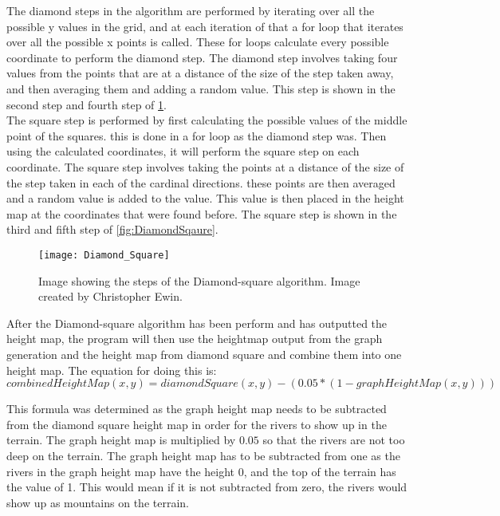 	The diamond steps in the algorithm are performed by iterating over all the possible y values in the grid, and at each iteration of that a for loop that iterates over all the possible x points is called. These for loops calculate every possible coordinate to perform the diamond step. The diamond step involves taking four values from the points that are at a distance of the size of the step taken away, and then averaging them and adding a random value. This step is shown in the second step and fourth step of \ref{fig:DiamondSquare}.\\


	The square step is performed by first calculating the possible values of the middle point of the squares. this is done in a for loop as the diamond step was. Then using the calculated coordinates, it will perform the square step on each coordinate. The square step involves taking the points at a distance of the size of the step taken in each of the cardinal directions. these points are then averaged and a random value is added to the value. This value is then placed in the height map at the coordinates that were found before. The square step is shown in the third and fifth step of \ref{fig:DiamondSqaure}.

\begin{figure}[H]
	\texttt{[image: Diamond\_Square]}
	\centering
	\caption{Image showing the steps of the Diamond-square algorithm. Image created by Christopher Ewin.}
	\label{fig:DiamondSquare}
\end{figure}

	After the Diamond-square algorithm has been perform and has outputted the height map, the program will then use the heightmap output from the graph generation and the height map from diamond square and combine them into one height map. The equation for doing this is:\\

	$$combinedHeightMap(x, y) =  diamondSquare(x, y) - (0.05 * (1 - graphHeightMap(x, y)))$$

	This formula was determined as the graph height map needs to be subtracted from the diamond square height map in order for the rivers to show up in the terrain. The graph height map is multiplied by $0.05$ so that the rivers are not too deep on the terrain. The graph height map has to be subtracted from one as the rivers in the graph height map have the height 0, and the top of the terrain has the value of 1. This would mean if it is not subtracted from zero, the rivers would show up as mountains on the terrain.\\

